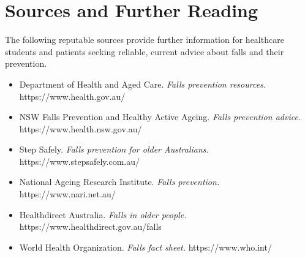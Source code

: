 \section*{Sources and Further Reading}
The following reputable sources provide further information for healthcare students and patients seeking reliable, current advice about falls and their prevention.
\begin{itemize}
    \item Department of Health and Aged Care. \textit{Falls prevention resources.} https://www.health.gov.au/
    \item NSW Falls Prevention and Healthy Active Ageing. \textit{Falls prevention advice.} https://www.health.nsw.gov.au/
    \item Step Safely. \textit{Falls prevention for older Australians.} https://www.stepsafely.com.au/
    \item National Ageing Research Institute. \textit{Falls prevention.} https://www.nari.net.au/
    \item Healthdirect Australia. \textit{Falls in older people.} https://www.healthdirect.gov.au/falls
    \item World Health Organization. \textit{Falls fact sheet.} https://www.who.int/
\end{itemize}
